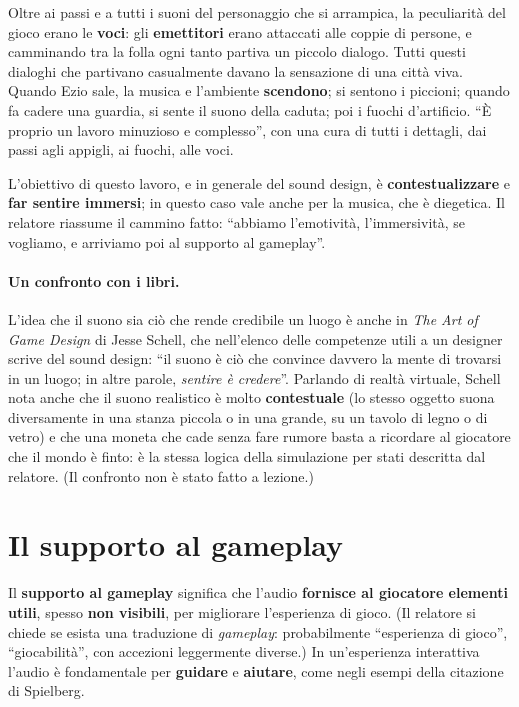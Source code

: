 Oltre ai passi e a tutti i suoni del personaggio che si arrampica, la peculiarità
del gioco erano le \textbf{voci}: gli \textbf{emettitori} erano attaccati alle
coppie di persone, e camminando tra la folla ogni tanto partiva un piccolo
dialogo. Tutti questi dialoghi che partivano casualmente davano la sensazione di
una città viva. Quando Ezio sale, la musica e l'ambiente \textbf{scendono}; si
sentono i piccioni; quando fa cadere una guardia, si sente il suono della caduta;
poi i fuochi d'artificio. ``È proprio un lavoro minuzioso e complesso'', con una
cura di tutti i dettagli, dai passi agli appigli, ai fuochi, alle voci.

L'obiettivo di questo lavoro, e in generale del sound design, è
\textbf{contestualizzare} e \textbf{far sentire immersi}; in questo caso vale
anche per la musica, che è diegetica. Il relatore riassume il cammino fatto:
``abbiamo l'emotività, l'immersività, se vogliamo, e arriviamo poi al supporto al
gameplay''.

\paragraph{Un confronto con i libri.} L'idea che il suono sia ciò che rende
credibile un luogo è anche in \emph{The Art of Game Design} di Jesse Schell,
che nell'elenco delle competenze utili a un designer scrive del sound design:
``il suono è ciò che convince davvero la mente di trovarsi in un luogo; in altre
parole, \emph{sentire è credere}''. Parlando di realtà virtuale, Schell nota
anche che il suono realistico è molto \textbf{contestuale} (lo stesso oggetto
suona diversamente in una stanza piccola o in una grande, su un tavolo di legno
o di vetro) e che una moneta che cade senza fare rumore basta a ricordare al
giocatore che il mondo è finto: è la stessa logica della simulazione per stati
descritta dal relatore. (Il confronto non è stato fatto a lezione.)

\section{Il supporto al gameplay}
\label{z9:sec:gameplay}

Il \textbf{supporto al gameplay} significa che l'audio \textbf{fornisce al
giocatore elementi utili}, spesso \textbf{non visibili}, per migliorare
l'esperienza di gioco. (Il relatore si chiede se esista una traduzione di
\emph{gameplay}: probabilmente ``esperienza di gioco'', ``giocabilità'', con
accezioni leggermente diverse.) In un'esperienza interattiva l'audio è
fondamentale per \textbf{guidare} e \textbf{aiutare}, come negli esempi della
citazione di Spielberg.

